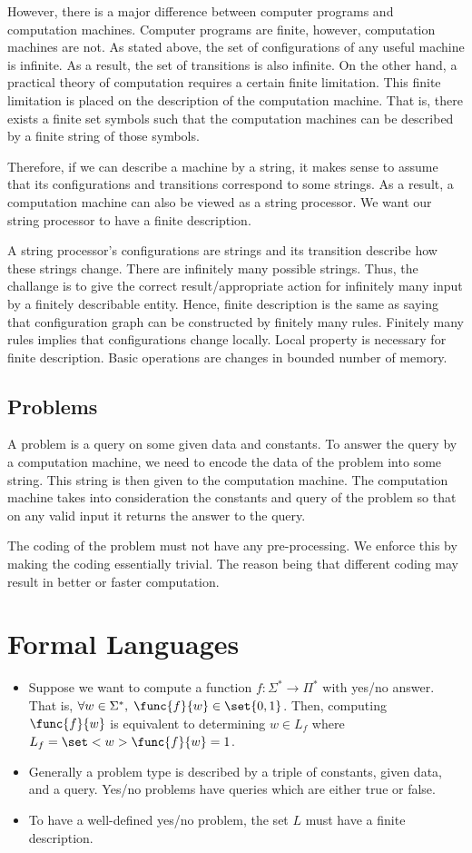 However, there is a major difference between computer programs and computation machines. Computer programs are finite, however, computation machines are not. As stated above, the set of configurations of any useful machine is infinite. As a result, the set of transitions is also infinite. On the other hand, a practical theory of computation requires a certain finite limitation. This finite limitation is placed on the description of the computation machine. That is, there exists a finite set symbols such that the computation machines can be described by a finite string of those symbols.

Therefore, if we can describe a machine by a string, it makes sense to assume that its configurations and transitions correspond to some strings. As a result, a computation machine can also be viewed as a string processor. We want our string processor to have a finite description.

A string processor's configurations are strings and its transition describe how these strings change. There are infinitely many possible strings. Thus, the challange is to give the correct result/appropriate action for infinitely many input by a finitely describable entity. Hence, finite description is the same as saying that configuration graph can be constructed by finitely many rules. Finitely many rules implies that configurations change locally. Local property is necessary for finite description. Basic operations are changes in bounded number of memory.

\subsection{Problems}
A problem is a query on some given data and constants. To answer the query by a computation machine, we need to encode the data of the problem into some string. This string is then given to the computation machine. The computation machine takes into consideration the constants and query of the problem so that on any valid input it returns the answer to the query. 

The coding of the problem must not have any pre-processing. We enforce this by making the coding essentially trivial. The reason being that different coding may result in better or faster computation.


\section{Formal Languages}
\begin{itemize}
    \item Suppose we want to compute a function \(f :\Sigma^{\ast} \to \Pi^{\ast}\) with yes/no answer. That is, \(\forall w \in \Sigma^{\ast},\; \func{f}{w} \in \set{0,1}\). Then, computing \(\func{f}{w}\) is equivalent to determining \(w \in L_f\) where \(L_f = \set<w>{\func{f}{w} = 1}\).
    \item Generally a problem type is described by a triple of constants, given data, and a query. Yes/no problems have queries which are either true or false.
    \item To have a well-defined yes/no problem, the set \(L\) must have a finite description.
\end{itemize}
